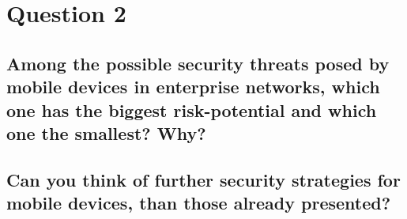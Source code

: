 \documentclass{report}
\begin{document}
	\section{Question 2}
	\startsection
		\renewcommand{\thesubsection}{\thesection.\Alph{subsection}}
		\subsection{Among the possible security threats posed by mobile devices in enterprise networks, which one has the biggest risk-potential and which one the smallest? Why?}
		\startsubsection
		\closesection
		
		\subsection{Can you think of further security strategies for mobile devices, than those already presented?}
		\startsubsection
		\closesection
	\closesection
\end{document}
